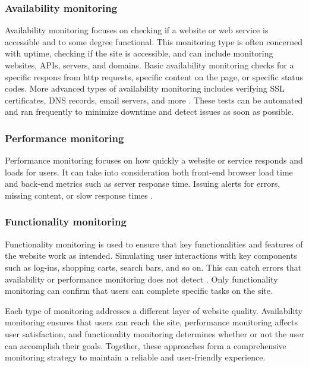 \subsubsection{Availability monitoring}
\label{subsubsec:availability_monitoring}


Availability monitoring focuses on checking if a website or web service is accessible and to some degree functional. This monitoring type is often concerned with uptime, checking if the site is accessible, and can include monitoring websites, APIs, servers, and domains. Basic availability monitoring checks for a specific respons from \acrshort{http} requests, specific content on the page, or specific status codes. More advanced types of availability monitoring includes verifying SSL certificates, DNS records, email servers, and more \autocite{Uptrendsmonitoring}. These tests can be automated and ran frequently to minimize downtime and detect issues as soon as possible.

\subsubsection{Performance monitoring}
\label{subsubsec:performance_monitoring}


Performance monitoring focuses on how quickly a website or service responds and loads for users. It can take into consideration both front-end browser load time and back-end metrics such as server response time. Issuing alerts for errors, missing content, or slow response times \autocite{Uptrendsmonitoring}.

\subsubsection{Functionality monitoring}
\label{subsubsec:functionality_monitoring}


Functionality monitoring is used to ensure that key functionalities and features of the website work as intended. Simulating user interactions with key components such as log-ins, shopping carts, search bars, and so on. This can catch errors that availability or performance monitoring does not detect \autocite{testRigor}. Only functionality monitoring can confirm that users can complete specific tasks on the site.

Each type of monitoring addresses a different layer of website quality. Availability monitoring ensures that users can reach the site, performance monitoring affects user satisfaction, and functionality monitoring determines whether or not the user can accomplish their goals. Together, these approaches form a comprehensive monitoring strategy to maintain a reliable and user-friendly experience.

